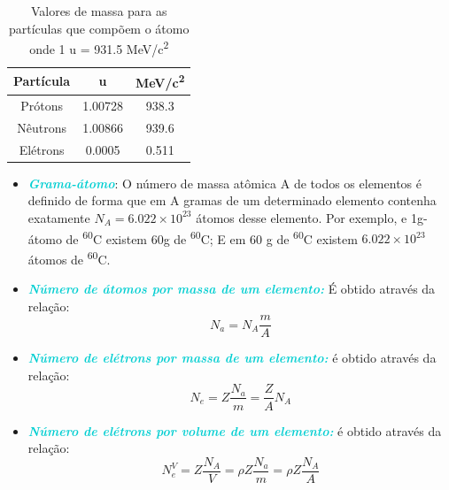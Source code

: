 \documentclass[11pt,a4paper]{article}
\newcounter{exemplo}
\begin{document}
            
            \begin{table}[h]
                \centering
                \caption{Valores de massa para as partículas que compõem o átomo onde 1 u = 931.5 \unit{MeV/c^2}}
                \begin{tabular}{c c c}
                    \toprule
                    Partícula &  u & \unit{MeV/c^2} \\
                    \midrule
                    Prótons & 1.00728 & 938.3 \\
                    Nêutrons & 1.00866 & 939.6 \\
                    Elétrons & 0.0005 & 0.511\\
                    \bottomrule
                    \bottomrule
                \end{tabular}
            \end{table}

            
	\begin{exemplo}
		\begin{itemize}
			\item \textbf{\textit{\textcolor{DarkTurquoise}{Grama-átomo}}}: O número de massa atômica A de todos os elementos é definido de forma que em A gramas de um determinado  elemento contenha exatamente $N_A = 6.022 \times 10^{23}$ átomos desse elemento. Por exemplo, e 1g-átomo de \textsuperscript{60}C existem 60g de \textsuperscript{60}C; E em 60 g de \textsuperscript{60}C existem $6.022 \times 10^{23}$ átomos de \textsuperscript{60}C.
			
			\item \textbf{\textit{\textcolor{DarkTurquoise}{Número de átomos por massa de um elemento:}}} É obtido através da relação:
				\begin{equation}
					N_a = N_A \frac{m}{A} 
				\end{equation}                    
			\item \textbf{\textit{\textcolor{DarkTurquoise}{Número de elétrons por massa de um elemento:}}} é obtido através da relação:
				\begin{equation}
					N_e = Z \frac{N_a}{m} =  \frac{Z}{A} N_A
				\end{equation}
			\item \textbf{\textit{\textcolor{DarkTurquoise}{Número de elétrons por volume de um elemento:}}} é obtido através da relação:				
				\begin{equation}
					N_e^V = Z \frac{N_A}{V} = \rho Z \frac{N_a}{m} = \rho Z \frac{N_A}{A}
				\end{equation}                    
		\end{itemize}
	\end{exemplo}
\end{document}
